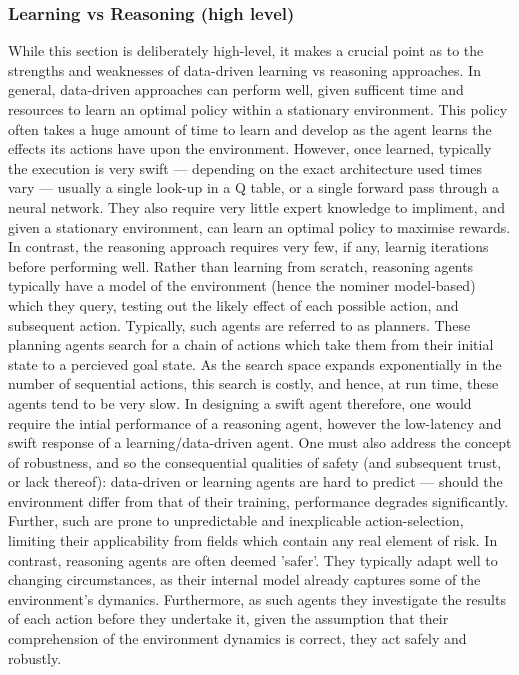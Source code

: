 \subsubsection{Learning vs Reasoning (high level)}
While this section is deliberately high-level, it makes a crucial point as to the strengths and weaknesses of data-driven learning vs reasoning approaches. 
In general, data-driven approaches can perform well, given sufficent time and resources to learn an optimal policy within a stationary environment. This policy often takes a huge amount of time to learn and develop as the agent learns the effects its actions have upon the environment. However, once learned, typically the execution is very swift --- depending on the exact architecture used times vary --- usually a single look-up in a Q table, or a single forward pass through a neural network. They also require very little expert knowledge to impliment, and given a stationary environment, can learn an optimal policy to maximise rewards. 
\newline \newline
In contrast, the reasoning approach requires very few, if any, learnig iterations before performing well. Rather than learning from scratch, reasoning agents typically have a model of the environment (hence the nominer model-based) which they query, testing out the likely effect of each possible action, and subsequent action. Typically, such agents are referred to as planners. These planning agents search for a chain of actions which take them from their initial state to a percieved goal state. As the search space expands exponentially in the number of sequential actions, this search is costly, and hence, at run time, these agents tend to be very slow. 
\newline\newline
In designing a swift agent therefore, one would require the intial performance of a reasoning agent, however the low-latency and swift response of a learning/data-driven agent. 
\newline \newline
One must also address the concept of robustness, and so the consequential qualities of safety (and subsequent trust, or lack thereof): data-driven or learning agents are hard to predict --- should the environment differ from that of their training, performance degrades significantly. 
Further, such are prone to unpredictable and inexplicable action-selection, limiting their applicability from fields which contain any real element of risk. In contrast, reasoning agents are often deemed 'safer'. 
They typically adapt well to changing circumstances, as their internal model already captures some of the environment's dymanics. 
Furthermore, as such agents they investigate the results of each action before they undertake it, given the assumption that their comprehension of the environment dynamics is correct, they act safely and robustly.



